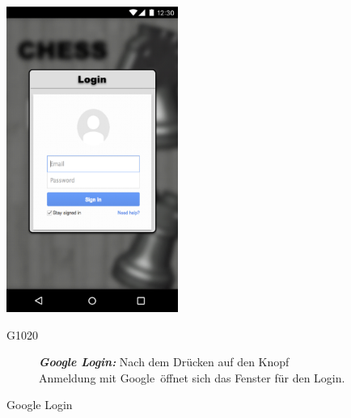 \documentclass[parskip=full]{scrartcl}
\begin{document}
\begin{figure}[htp]
	\begin{minipage}[t]{6cm}
		\vspace{0pt}
		\includegraphics[height=100mm]{google_login.png}
		\caption{Google Login}
		\label{fig:Google Login}
	\end{minipage}
	\hfill
	\begin{minipage}[t]{6cm}
		\vspace{0pt}
		\begin{description}
			\item[G1020] \textbf{\textit{Google Login: }} Nach dem Drücken auf den Knopf \glqq Anmeldung mit Google\grqq\ öffnet sich das Fenster für den Login.
		\end{description}
	\end{minipage}
\end{figure}
\end{document}
